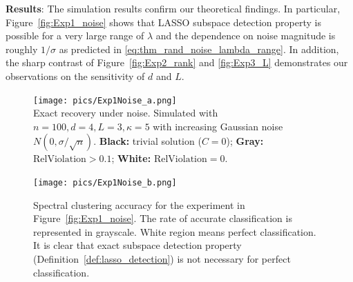 \documentclass[twoside,11pt]{article}
\numberwithin{equation}{section}
\begin{document}
\textbf{Results}:
The simulation results confirm our theoretical findings. In particular, Figure~\ref{fig:Exp1_noise} shows that LASSO subspace detection property is possible for a very large range of $\lambda$ and the dependence on noise magnitude is roughly $1/\sigma$ as predicted in \eqref{eq:thm_rand_noise_lambda_range}. In addition, the sharp contrast of Figure~\ref{fig:Exp2_rank} and \ref{fig:Exp3_L} demonstrates our observations on the sensitivity of $d$ and $L$. %




\begin{figure}[htb]
\begin{minipage}[t]{0.46\linewidth}
  \centering
  \texttt{[image: pics/Exp1Noise\_a.png]}\\
  \caption[Exact recovery vs. increasing noise.]{Exact recovery under noise. Simulated with $n=100, d=4, L=3, \kappa=5$ with increasing Gaussian noise $N(0,\sigma/\sqrt{n})$. \textbf{ Black:} trivial solution ($C=0$); \textbf{Gray:} $\mathrm{RelViolation}>0.1$; \textbf{White:} $\mathrm{RelViolation}=0$.  }\label{fig:Exp1_noise}
\end{minipage}
\hspace{0.3cm}
\begin{minipage}[t]{0.53\linewidth}
  \centering
  \texttt{[image: pics/Exp1Noise\_b.png]}\\
  \caption[Spectral clustering accuracy vs. increasing noise.]{Spectral clustering accuracy for the experiment in Figure~\ref{fig:Exp1_noise}. The rate of accurate classification is represented in grayscale. White region means perfect classification. It is clear that exact subspace detection property (Definition~\ref{def:lasso_detection}) is not necessary for perfect classification. }\label{fig:Exp1_acc_map}
\end{minipage}
\end{figure}
\end{document}
